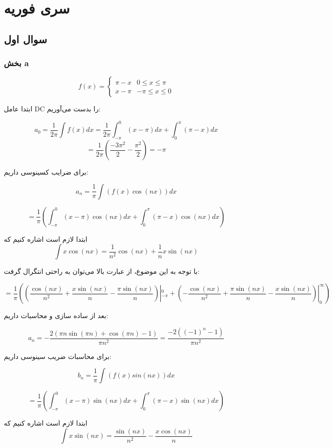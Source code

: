 \documentclass[12pt]{article}
\begin{document}
\KashidaOff

\section{سری فوریه}
\subsection{سوال اول}

\subsubsection{بخش a}


$$
f(x)=\left\{\begin{array}{lr}
	\pi-x & 0 \leq x \leq \pi \\
	x-\pi & -\pi \leq x \leq 0
\end{array}\right.
$$

ابتدا عامل DC را بدست می‌آوریم:

$$a_0 = \frac{1}{2\pi} \int f(x) dx = \frac{1}{2\pi} \int_{-\pi}^{0} (x- \pi) dx + \int_{0}^{\pi} (\pi -x) dx$$
$$= \frac{1}{2\pi} (\frac{-3\pi^2}{2} - \frac{\pi^2}{2}) = \boxed{- \pi} $$

برای ضرایب کسینوسی داریم:

$$a_n = \frac{1}{\pi} \int (f(x) \cos (nx)) dx$$

$$= \frac{1}{\pi} (\int_{-\pi}^{0} (x - \pi) \cos (nx) dx + \int_{0}^{\pi} (\pi - x) \cos (nx) dx)$$

ابتدا لازم است اشاره کنیم که
$$\int x \cos (nx) = \frac{1}{n^2} \cos(nx) + \frac{1}{n} x \sin (nx)$$

با توجه به این موضوع، از عبارت بالا می‌توان به راحتی انتگرال گرفت:


$$= \frac{1}{\pi}( (\frac{\cos (n x)}{n^2}+\frac{x \sin (n x)}{n}-\frac{\pi  \sin (n x)}{n}) |_{-\pi}^{0} + (-\frac{\cos (n x)}{n^2}+\frac{\pi  \sin (n x)}{n}-\frac{x \sin (n x)}{n})|_{0}^{\infty})$$

بعد از ساده سازی و محاسبات داریم:

$$\boxed{a_n = -\frac{2 (\pi  n \sin (\pi  n)+\cos (\pi  n)-1)}{\pi  n^2} = \frac{-2((-1)^n -1)}{\pi n^2}}$$


برای محاسبات ضریب سینوسی داریم:

$$b_n = \frac{1}{\pi} \int (f(x) sin(nx)) dx$$

$$= \frac{1}{\pi} (\int_{-\pi}^{0} (x - \pi) \sin (nx) dx + \int_{0}^{\pi} (\pi - x) \sin (nx) dx)$$


ابتدا لازم است اشاره کنیم که
$$\int x \sin(nx) = \frac{\sin (n x)}{n^2}-\frac{x \cos (n x)}{n}  $$
\end{document}
